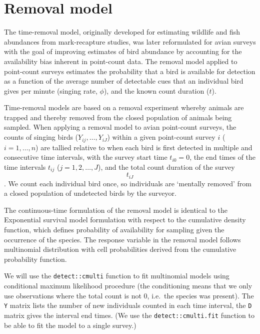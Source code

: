 \documentclass[12pt,]{book}
\begin{document}
\hypertarget{removal-model}{%
\section{Removal model}\label{removal-model}}

The time-removal model, originally developed for estimating wildlife and fish abundances from mark-recapture studies, was later reformulated for avian surveys with the goal of improving estimates of bird abundance by accounting for the availability bias inherent in point-count data. The removal model applied to point-count surveys estimates the probability that a bird is available for detection as a function of the average number of detectable cues that an individual bird gives per minute (singing rate, \(\phi\)), and the known count duration (\(t\)).

Time-removal models are based on a removal experiment whereby animals are trapped and thereby removed from the closed population of animals being sampled. When applying a removal model to avian point-count surveys, the counts of singing birds (\(Y_{ij}, \ldots, Y_{iJ}\)) within a given point-count survey \(i\) (\(i = 1,\ldots, n\)) are tallied relative to when each bird is first detected in multiple and consecutive time intervals, with the survey start time \(t_{i0} = 0\), the end times of the time intervals \(t_{ij}\) (\(j = 1, 2,\ldots, J\)), and the total count duration of the survey \[t_{iJ}\]. We count each individual bird once, so individuals are `mentally removed' from a closed population of undetected birds by the surveyor.

The continuous-time formulation of the removal model is identical to the Exponential survival model
formulation with respect to the cumulative density function, which defines probability of
availability for sampling given the occurrence of the species.
The response variable in the removal model follows multinomial distribution
with cell probabilities derived from the cumulative probability function.

We will use the \texttt{detect::cmulti} function to fit multinomial models using
conditional maximum likelihood procedure (the conditioning means that we only use
observations where the total count is not 0, i.e.~the species was present).
The \texttt{Y} matrix lists the number of new individuals counted in each time interval,
the \texttt{D} matrix gives the interval end times.
(We use the \texttt{detect::cmulti.fit} function to be able to fit the model to a single survey.)
\end{document}

